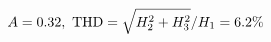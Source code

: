 \documentclass[preview]{standalone}
\begin{document}
\begin{align*}
\special{dvisvgm:raw <g id='unique000'>}A=0.32,\ \text{THD}=\sqrt{H_2^2+H_3^2}/H_1=6.2\%\special{dvisvgm:raw </g>}
\end{align*}
\end{document}
